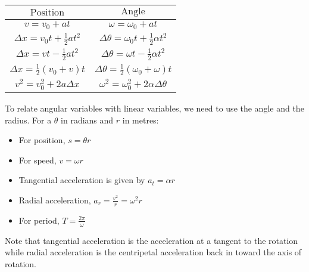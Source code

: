 \documentclass[12pt]{report}
\begin{document}
\begin{flushleft}
\begin{center}
    \begin{tabular}{c|c}
        \(\mathrm{Position}\) & \(\mathrm{Angle}\) \\
        \hline
        \(v = v_0 + at\) & 
        \(\omega = \omega_0 + at\) \\[7pt]
        \(\Delta x = v_0t + \frac{1}{2}at^2\) & 
        \(\Delta\theta = \omega_0t + \frac{1}{2}\alpha t^2\) \\[7pt]
        \(\Delta x = vt - \frac{1}{2}at^2\) &
        \(\Delta\theta = \omega t - \frac{1}{2}\alpha t^2\) \\[7pt]
        \(\Delta x = \frac{1}{2}(v_0 + v)t\) &
        \(\Delta\theta = \frac{1}{2}(\omega_0 + \omega)t\) \\[7pt]
        \(v^2 = v_0^2 + 2a\Delta x\) & 
        \(\omega^2 = \omega_0^2 + 2\alpha\Delta\theta\) \\[7pt]
    \end{tabular}        
\end{center}

To relate angular variables with linear variables, we need to use the angle and
the radius. For a \(\theta\) in radians and \(r\) in metres:
\begin{itemize}
    \item For position, \(s = \theta r\)
    \item For speed, \(v = \omega r\)
    \item Tangential acceleration is given by \(a_t = \alpha r\)
    \item Radial acceleration, \(a_r = \frac{v^2}{r} = \omega^2 r\)
    \item For period, \(T = \frac{2\pi}{\omega}\)
\end{itemize}
Note that tangential acceleration is the acceleration at a tangent to the
rotation while radial acceleration is the centripetal acceleration back in
toward the axis of rotation.


\end{flushleft}
\end{document}
